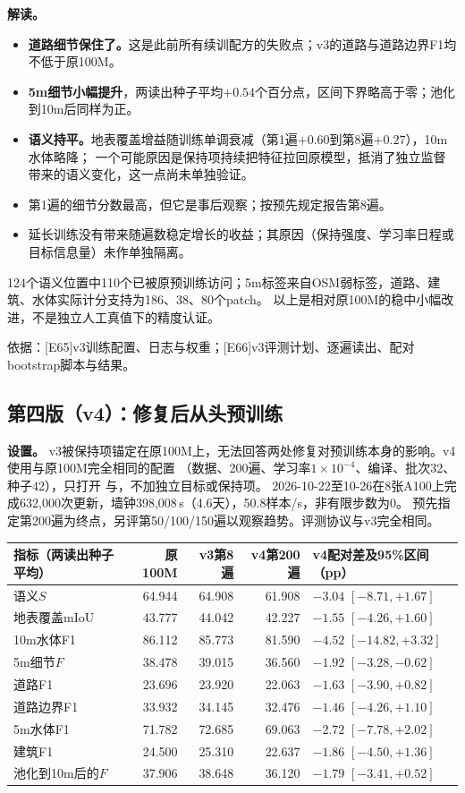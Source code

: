 \documentclass[UTF8,fontset=fandol,zihao=5,a4paper]{ctexart}
\newcommand{\source}[1]{\par{\footnotesize\color{muted}依据：#1}\par}
\begin{document}
\textbf{解读。}
\begin{itemize}
\item \textbf{道路细节保住了。}这是此前所有续训配方的失败点；v3的道路与道路边界F1均不低于原100M。
\item \textbf{5m细节小幅提升}，两读出种子平均$+0.54$个百分点，区间下界略高于零；池化到10m后同样为正。
\item \textbf{语义持平。}地表覆盖增益随训练单调衰减（第1遍$+0.60$到第8遍$+0.27$），10m水体略降；
一个可能原因是保持项持续把特征拉回原模型，抵消了独立监督带来的语义变化，这一点尚未单独验证。
\item 第1遍的细节分数最高，但它是事后观察；按预先规定报告第8遍。
\item 延长训练没有带来随遍数稳定增长的收益；其原因（保持强度、学习率日程或目标信息量）未作单独隔离。
\end{itemize}
124个语义位置中110个已被原预训练访问；5m标签来自OSM弱标签，道路、建筑、水体实际计分支持为186、38、80个patch。
以上是相对原100M的稳中小幅改进，不是独立人工真值下的精度认证。
\source{[E65]v3训练配置、日志与权重；[E66]v3评测计划、逐遍读出、配对bootstrap脚本与结果。}

\subsection{第四版（v4）：修复后从头预训练}
\textbf{设置。} v3被保持项锚定在原100M上，无法回答两处修复对预训练本身的影响。v4使用与原100M完全相同的配置
（数据、200遍、学习率$1\times10^{-4}$、编译、批次32、种子42），只打开
与，不加独立目标或保持项。
2026-10-22至10-26在8张A100上完成632{,}000次更新，墙钟398{,}008\,s（4.6天），50.8样本/s，非有限步数为0。
预先指定第200遍为终点，另评第50/100/150遍以观察趋势。评测协议与v3完全相同。

\begin{center}\small
\begin{tabularx}{\linewidth}{@{}lrrrY@{}}
\toprule 指标（两读出种子平均） & 原100M & v3第8遍 & v4第200遍 & v4配对差及95\%区间（pp）\\\midrule
语义$S$ & 64.944 & 64.908 & 61.908 & $-3.04$ $[-8.71,+1.67]$\\
\quad 地表覆盖mIoU & 43.777 & 44.042 & 42.227 & $-1.55$ $[-4.26,+1.60]$\\
\quad 10m水体F1 & 86.112 & 85.773 & 81.590 & $-4.52$ $[-14.82,+3.32]$\\
5m细节$F$ & 38.478 & 39.015 & 36.560 & $-1.92$ $[-3.28,-0.62]$\\
\quad 道路F1 & 23.696 & 23.920 & 22.063 & $-1.63$ $[-3.90,+0.82]$\\
\quad 道路边界F1 & 33.932 & 34.145 & 32.476 & $-1.46$ $[-4.26,+1.10]$\\
\quad 5m水体F1 & 71.782 & 72.685 & 69.063 & $-2.72$ $[-7.78,+2.02]$\\
\quad 建筑F1 & 24.500 & 25.310 & 22.637 & $-1.86$ $[-4.50,+1.36]$\\
池化到10m后的$F$ & 37.906 & 38.648 & 36.120 & $-1.79$ $[-3.41,+0.52]$\\\bottomrule
\end{tabularx}
\end{center}
\end{document}
